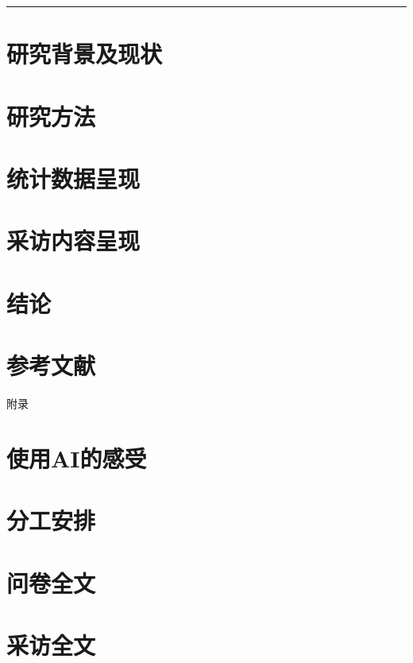 \documentclass{source/Paper}
\begin{document}
\noindent\rule{\textwidth}{1pt}

\section{研究背景及现状}

\section{研究方法}

\section{统计数据呈现}

\section{采访内容呈现}

% 
\section{结论}

\section{参考文献}
\printbibliography[heading=bibliography, title=参考文献]
\newpage
\appendix
{\noindent \Large 附录}
\section{使用AI的感受}

\section{分工安排}

\newpage
\section{问卷全文}

\newpage
\section{采访全文}

\end{document}
